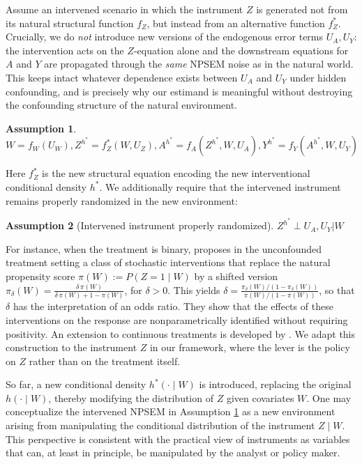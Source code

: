 \documentclass[12pt]{article}
\theoremstyle{thmstyleone}%
\theoremstyle{thmstyletwo}%
\theoremstyle{thmstylethree}%
\newtheorem{assumption}{Assumption}
\begin{document}
Assume an intervened scenario in which the instrument $Z$ is generated not from its natural structural function $f_Z$, but instead from an alternative function $f_Z^*$.  {Crucially, we do \emph{not} introduce new versions of the endogenous error terms $U_A,U_Y$: the intervention acts on the $Z$-equation alone and the downstream equations for $A$ and $Y$ are propagated through the \emph{same} NPSEM noise as in the natural world. This keeps intact whatever dependence exists between $U_A$ and $U_Y$ under hidden confounding, and is precisely why our estimand is meaningful without destroying the confounding structure of the natural environment.}
\begin{assumption}\label{ass:intsem} $W = f_W(U_W) , Z^{h^*}= f^*_Z(W, {U}_Z) , A^{h^*} = f_A(Z^{h^*}, W,  {U_A}) , Y^{h^*} = f_Y(A^{h^*},W, {U_Y}) $\end{assumption}

Here $f^*_Z$ is the new structural equation encoding the new interventional conditional density $h^*$.  {We additionally require that the intervened instrument remains properly randomized in the new environment:}

\begin{assumption}[Intervened instrument properly randomized]\label{iipr} $Z^{h^*} \perp  {U_A, U_Y}  |W$
\end{assumption}


For instance, when the treatment is binary, \citep{kenshift} proposes in the unconfounded treatment setting a class of stochastic interventions  {that replace the natural propensity score $\pi(W) := P(Z=1\mid W)$ by a shifted version $\pi_\delta(W) = \frac{\delta\,\pi(W)}{\delta\,\pi(W) + 1 - \pi(W)}$, for $\delta>0$. This yields $\delta = \frac{\pi_\delta(W)/(1-\pi_\delta(W))}{\pi(W)/(1-\pi(W))}$, so that $\delta$ has the interpretation of an odds ratio.} They show that the effects of these interventions on the response are nonparametrically identified without requiring positivity.  {An extension to continuous treatments is developed by \citet{schindl2024incremental}. We adapt this construction to the instrument $Z$ in our framework, where the lever is the policy on $Z$ rather than on the treatment itself.}

So far, a new conditional density $h^*(\cdot \mid W)$ is introduced, replacing the original $h(\cdot \mid W)$, thereby modifying the distribution of $Z$ given covariates $W$. One may conceptualize the intervened NPSEM in Assumption \ref{ass:intsem} as a new environment arising from manipulating the conditional distribution of the instrument $Z \mid W$. This perspective is consistent with the practical view of instruments as variables that can, at least in principle, be manipulated by the analyst or policy maker. 
\end{document}
